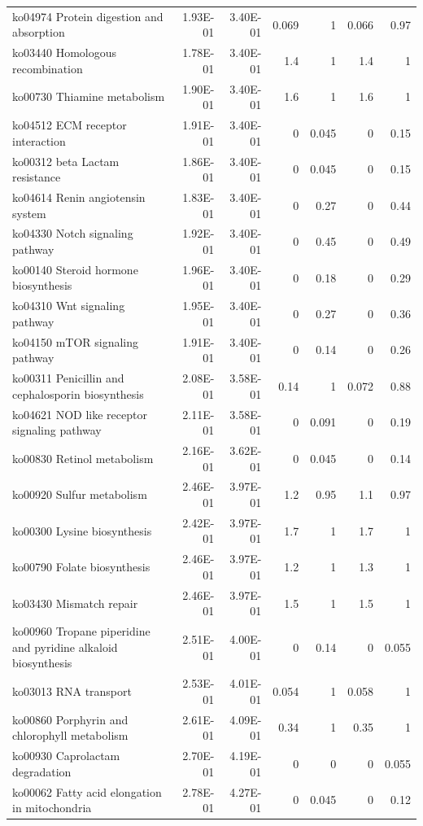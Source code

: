 {\begin{longtable}{ | l | r | r | r | r | r | r  | }
		ko04974 Protein digestion and absorption & 1.93E-01 & 3.40E-01 & 0.069 & 1 & 0.066 & 0.97\\ 
		ko03440 Homologous recombination & 1.78E-01 & 3.40E-01 & 1.4 & 1 & 1.4 & 1\\ 
		ko00730 Thiamine metabolism & 1.90E-01 & 3.40E-01 & 1.6 & 1 & 1.6 & 1\\ 
		ko04512 ECM receptor interaction & 1.91E-01 & 3.40E-01 & 0 & 0.045 & 0 & 0.15\\ 
		ko00312 beta Lactam resistance & 1.86E-01 & 3.40E-01 & 0 & 0.045 & 0 & 0.15\\ 
		ko04614 Renin angiotensin system & 1.83E-01 & 3.40E-01 & 0 & 0.27 & 0 & 0.44\\ 
		ko04330 Notch signaling pathway & 1.92E-01 & 3.40E-01 & 0 & 0.45 & 0 & 0.49\\ 
		ko00140 Steroid hormone biosynthesis & 1.96E-01 & 3.40E-01 & 0 & 0.18 & 0 & 0.29\\ 
		ko04310 Wnt signaling pathway & 1.95E-01 & 3.40E-01 & 0 & 0.27 & 0 & 0.36\\ 
		ko04150 mTOR signaling pathway & 1.91E-01 & 3.40E-01 & 0 & 0.14 & 0 & 0.26\\ 
		ko00311 Penicillin and cephalosporin biosynthesis & 2.08E-01 & 3.58E-01 & 0.14 & 1 & 0.072 & 0.88\\ 
		ko04621 NOD like receptor signaling pathway & 2.11E-01 & 3.58E-01 & 0 & 0.091 & 0 & 0.19\\ 
		ko00830 Retinol metabolism & 2.16E-01 & 3.62E-01 & 0 & 0.045 & 0 & 0.14\\ 
		ko00920 Sulfur metabolism & 2.46E-01 & 3.97E-01 & 1.2 & 0.95 & 1.1 & 0.97\\ 
		ko00300 Lysine biosynthesis & 2.42E-01 & 3.97E-01 & 1.7 & 1 & 1.7 & 1\\ 
		ko00790 Folate biosynthesis & 2.46E-01 & 3.97E-01 & 1.2 & 1 & 1.3 & 1\\ 
		ko03430 Mismatch repair & 2.46E-01 & 3.97E-01 & 1.5 & 1 & 1.5 & 1\\ 
		ko00960 Tropane piperidine and pyridine alkaloid biosynthesis & 2.51E-01 & 4.00E-01 & 0 & 0.14 & 0 & 0.055\\ 
		ko03013 RNA transport & 2.53E-01 & 4.01E-01 & 0.054 & 1 & 0.058 & 1\\ 
		ko00860 Porphyrin and chlorophyll metabolism & 2.61E-01 & 4.09E-01 & 0.34 & 1 & 0.35 & 1\\ 
		ko00930 Caprolactam degradation & 2.70E-01 & 4.19E-01 & 0 & 0 & 0 & 0.055\\ 
		ko00062 Fatty acid elongation in mitochondria & 2.78E-01 & 4.27E-01 & 0 & 0.045 & 0 & 0.12\\ 

\end{longtable}}
